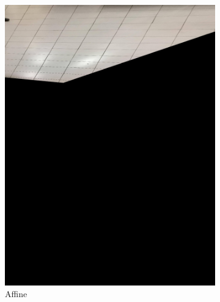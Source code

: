\documentclass[paper=a4, fontsize=11pt]{scrartcl} %
\begin{document}
\begin{figure}
\begin{subfigure}[ht]{0.3\textwidth}
        \centering 
        \includegraphics[width=\textwidth]{figures/persp_tile_aff.jpg}
        \caption{Affine\label{fig:persp_tile_aff}}    
    \end{subfigure}
    \hfill
    \begin{subfigure}[ht]{0.3\textwidth}   
        \centering 

\end{subfigure}
\end{figure}
\end{document}
